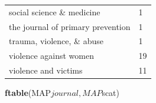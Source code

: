 \documentclass[]{tufte-handout}
\newenvironment{Shaded}{}{}
\newcommand{\KeywordTok}[1]{\textbf{{#1}}}
\newcommand{\NormalTok}[1]{{#1}}
\begin{document}
\begin{longtable}[]{@{}ll@{}}
\begin{minipage}[t]{0.67\columnwidth}\raggedright\strut
social science \& medicine\strut
\end{minipage} & \begin{minipage}[t]{0.08\columnwidth}\raggedright\strut
1\strut
\end{minipage}\tabularnewline
\begin{minipage}[t]{0.67\columnwidth}\raggedright\strut
the journal of primary prevention\strut
\end{minipage} & \begin{minipage}[t]{0.08\columnwidth}\raggedright\strut
1\strut
\end{minipage}\tabularnewline
\begin{minipage}[t]{0.67\columnwidth}\raggedright\strut
trauma, violence, \& abuse\strut
\end{minipage} & \begin{minipage}[t]{0.08\columnwidth}\raggedright\strut
1\strut
\end{minipage}\tabularnewline
\begin{minipage}[t]{0.67\columnwidth}\raggedright\strut
violence against women\strut
\end{minipage} & \begin{minipage}[t]{0.08\columnwidth}\raggedright\strut
19\strut
\end{minipage}\tabularnewline
\begin{minipage}[t]{0.67\columnwidth}\raggedright\strut
violence and victims\strut
\end{minipage} & \begin{minipage}[t]{0.08\columnwidth}\raggedright\strut
11\strut
\end{minipage}\tabularnewline
\bottomrule
\end{longtable}

\begin{Shaded}
\begin{Highlighting}[]
\KeywordTok{ftable}\NormalTok{(MAP$journal, MAP$scat)}
\end{Highlighting}
\end{Shaded}
\end{document}
